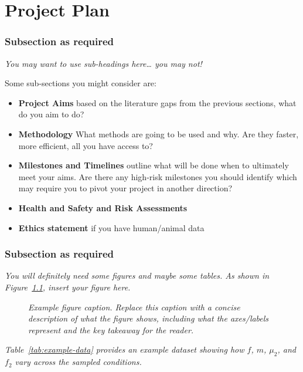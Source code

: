 \documentclass[12pt,openany,a4paper]{book}
\newcommand{\purple}[1]{\textcolor{topicpurple}{\textit{#1}}}
\begin{document}
\chapter{Project Plan}

\subsection{Subsection as required}
{\color{topicpurple}\itshape
You may want to use sub-headings here\dots{} you may not!

Some sub-sections you might consider are:
\begin{itemize}
  \item \textbf{Project Aims} based on the literature gaps from the previous sections, what do you aim to do?
  \item \textbf{Methodology} What methods are going to be used and why. Are they faster, more efficient, all you have access to?
  \item \textbf{Milestones and Timelines} outline what will be done when to ultimately meet your aims. Are there any high-risk milestones you should identify which may require you to pivot your project in another direction?
  \item \textbf{Health and Safety and Risk Assessments}
  \item \textbf{Ethics statement} if you have human/animal data
\end{itemize}
}
\subsection{Subsection as required}
\purple{You will definitely need some figures and maybe some tables. As shown in Figure~\ref{fig:example}, \textcolor{topicpurple}{\textit{insert your figure here}}.}

\begin{figure}[htbp]
  \centering
  \caption{\purple{Example figure caption. Replace this caption with a concise description of what the figure shows, including what the axes/labels represent and the key takeaway for the reader.}}
  \label{fig:example}
\end{figure}

\purple{ Table~\ref{tab:example-data} provides an example dataset showing how \(f\), \(m\), \(\mu_2\), and \(f_2\) vary across the sampled conditions.}
\end{document}
